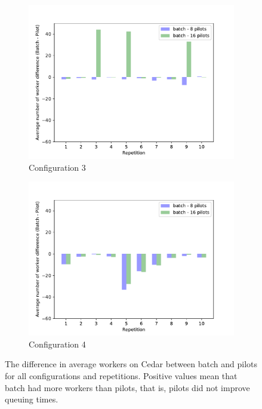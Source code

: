 \begin{figure}
\begin{subfigure}[b]{0.475\textwidth}
		\centering
		\includegraphics[width=\textwidth]{figures/spa/nworkers_3_cedar}
		\caption[]%
		{{\small Configuration 3}}
		\label{fig:spa:nwcedar3}
	    \end{subfigure}
	    \quad
	    \begin{subfigure}[b]{0.475\textwidth}
		\centering
		\includegraphics[width=\textwidth]{figures/spa/nworkers_4_cedar}
		\caption[]%
		{{\small Configuration 4}}
		\label{fig:spa:nwcedar4}
	    \end{subfigure}
	    \caption{\small The difference in average workers on Cedar between
	    batch and pilots for all configurations and repetitions. Positive
	    values mean that batch had more workers than pilots, that is, pilots
	    did not improve queuing times.}
	    \label{fig:spa:nworkerscedar}
	\end{figure}
    
